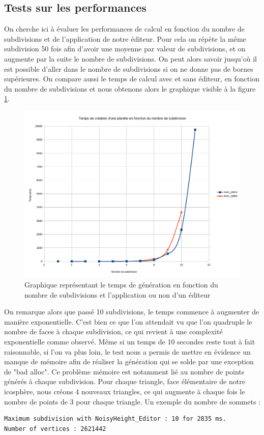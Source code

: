 \documentclass[a4paper]{article}
\begin{document}
\subsection{Tests sur les performances}

On cherche ici à évaluer les performances de calcul en fonction du nombre de subdivisions et de l'application de notre éditeur. Pour cela on répète la même subdivision 50 fois afin d'avoir une moyenne par valeur de subdivisions, et on augmente par la suite le nombre de subdivisions. On peut alors savoir jusqu'où il est possible d'aller dans le nombre de subdivisions si on ne donne pas de bornes supérieures. On compare aussi le temps de calcul avec et sans éditeur, en fonction du nombre de subdivisions et nous obtenons alors le graphique visible à la figure \ref{graphperf}.

\begin{figure}[!ht]
    \begin{center}
        \includegraphics[scale=0.4]{img/perf.png}
        \caption{Graphique représentant le temps de génération en fonction du nombre de subdivisions et l'application ou non d'un éditeur}
        \label{graphperf}
    \end{center}
\end{figure}

On remarque alors que passé 10 subdivisions, le temps commence à augmenter de manière exponentielle. C'est bien ce que l'on attendait vu que l'on quadruple le nombre de faces à chaque subdivision, ce qui revient à une complexité exponentielle comme observé. Même si un temps de 10 secondes reste tout à fait raisonnable, si l'on va plus loin, le test nous a permis de mettre en évidence un manque de mémoire afin de réaliser la génération qui se solde par une exception de "bad alloc". Ce problème mémoire est notamment lié au nombre de points générés à chaque subdivision. Pour chaque triangle, face élémentaire de notre icosphère, nous créons 4 nouveaux triangles, ce qui augmente à chaque fois le nombre de points de 3 pour chaque triangle.
Un exemple du nombre de sommets :
\begin{lstlisting}[caption= Résultat des tests unitaires]
Maximum subdivision with NoisyHeight_Editor : 10 for 2835 ms.
Number of vertices : 2621442
\end{lstlisting}
\end{document}
